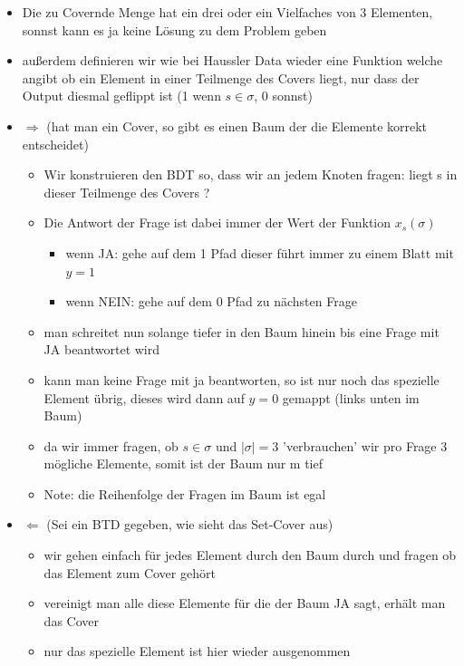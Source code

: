 \documentclass[12pt,a4paper]{article}
\begin{document}
\begin{itemize}
\item Die zu Covernde Menge hat ein drei oder ein Vielfaches von 3 Elementen, sonnst kann es ja keine Lösung zu dem Problem geben
\item außerdem definieren wir wie bei Haussler Data wieder eine Funktion welche angibt ob ein Element in einer Teilmenge des Covers liegt, nur dass der Output diesmal geflippt ist (1 wenn $s\in\sigma$, 0 sonnst)
\item $\Rightarrow$ (hat man ein Cover, so gibt es einen Baum der die Elemente korrekt entscheidet)
\begin{itemize}
\item Wir konstruieren den BDT so, dass wir an jedem Knoten fragen: liegt s in dieser Teilmenge des Covers ?
\item Die Antwort der Frage ist dabei immer der Wert der Funktion $x_s(\sigma)$
\begin{itemize}
\item wenn JA: gehe auf dem 1 Pfad dieser führt immer zu einem Blatt mit $y=1$
\item wenn NEIN: gehe auf dem 0 Pfad zu nächsten Frage
\end{itemize}
\item man schreitet nun solange tiefer in den Baum hinein bis eine Frage mit JA beantwortet wird
\item kann man keine Frage mit ja beantworten, so ist nur noch das spezielle Element übrig, dieses wird dann auf $y=0$ gemappt (links unten im Baum)
\item da wir immer fragen, ob $s\in\sigma$ und $|\sigma| = 3$ 'verbrauchen' wir pro Frage 3 mögliche Elemente, somit ist der Baum nur m tief
\item Note: die Reihenfolge der Fragen im Baum ist egal
\end{itemize}
\item $\Leftarrow$ (Sei ein BTD gegeben, wie sieht das Set-Cover aus)
\begin{itemize}
\item wir gehen einfach für jedes Element durch den Baum durch und fragen ob das Element zum Cover gehört
\item vereinigt man alle diese Elemente für die der Baum JA sagt, erhält man das Cover
\item nur das spezielle Element ist hier wieder ausgenommen
\end{itemize}
\end{itemize}
\end{document}
